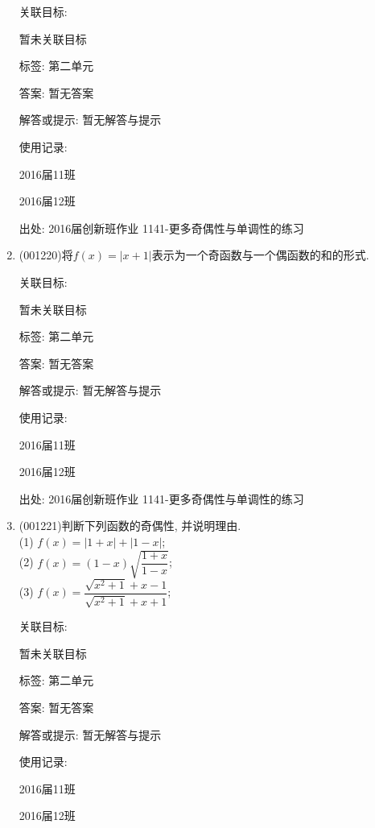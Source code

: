 \documentclass[10pt,a4paper]{article}
\begin{document}
\begin{enumerate}[1.]
关联目标:

暂未关联目标



标签: 第二单元

答案: 暂无答案

解答或提示: 暂无解答与提示

使用记录:

2016届11班	

2016届12班	


出处: 2016届创新班作业	1141-更多奇偶性与单调性的练习
\item { (001220)}将$f(x)=|x+1|$表示为一个奇函数与一个偶函数的和的形式.


关联目标:

暂未关联目标



标签: 第二单元

答案: 暂无答案

解答或提示: 暂无解答与提示

使用记录:

2016届11班	

2016届12班	


出处: 2016届创新班作业	1141-更多奇偶性与单调性的练习
\item { (001221)}判断下列函数的奇偶性, 并说明理由.\\ 
(1) $f(x)=|1+x|+|1-x|$;\\ 
(2) $f(x)=(1-x)\sqrt{\dfrac{1+x}{1-x}}$;\\ 
(3) $f(x)=\dfrac{\sqrt{x^2+1}+x-1}{\sqrt{x^2+1}+x+1}$;


关联目标:

暂未关联目标



标签: 第二单元

答案: 暂无答案

解答或提示: 暂无解答与提示

使用记录:

2016届11班			

2016届12班			



\end{enumerate}
\end{document}
